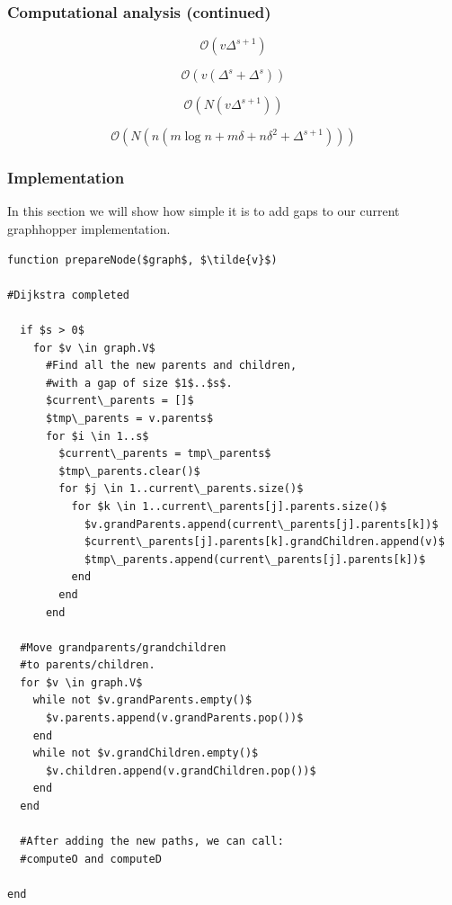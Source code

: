 \documentclass{article}
\begin{document}
\subsubsection{Computational analysis (continued)}

\begin{equation}
\mathcal{O}\left(v \Delta^{s + 1}\right)
\end{equation}

\begin{equation}
\mathcal{O}\left(v \left(\Delta^{s} + \Delta^{s}\right)\right)
\end{equation}

\begin{equation}
\mathcal{O}\left(N\left(v \Delta^{s + 1}\right)\right)
\end{equation}

\begin{equation}
\mathcal{O}\left(N\left(n\left(m\log n + m\delta + n\delta^2 + \Delta^{s + 1}\right)\right)\right)
\end{equation}

\subsubsection{Implementation}
In this section we will show how simple it is to add gaps to our current graphhopper implementation.
\begin{lstlisting}
function prepareNode($graph$, $\tilde{v}$)

#Dijkstra completed

  if $s > 0$
    for $v \in graph.V$
      #Find all the new parents and children, 
      #with a gap of size $1$..$s$.
      $current\_parents = []$
      $tmp\_parents = v.parents$
      for $i \in 1..s$
        $current\_parents = tmp\_parents$
        $tmp\_parents.clear()$
        for $j \in 1..current\_parents.size()$
          for $k \in 1..current\_parents[j].parents.size()$
            $v.grandParents.append(current\_parents[j].parents[k])$
            $current\_parents[j].parents[k].grandChildren.append(v)$
            $tmp\_parents.append(current\_parents[j].parents[k])$
          end
        end
      end

  #Move grandparents/grandchildren
  #to parents/children.
  for $v \in graph.V$
    while not $v.grandParents.empty()$
      $v.parents.append(v.grandParents.pop())$
    end
    while not $v.grandChildren.empty()$
      $v.children.append(v.grandChildren.pop())$
    end
  end

  #After adding the new paths, we can call:
  #computeO and computeD

end
\end{lstlisting}
\end{document}
